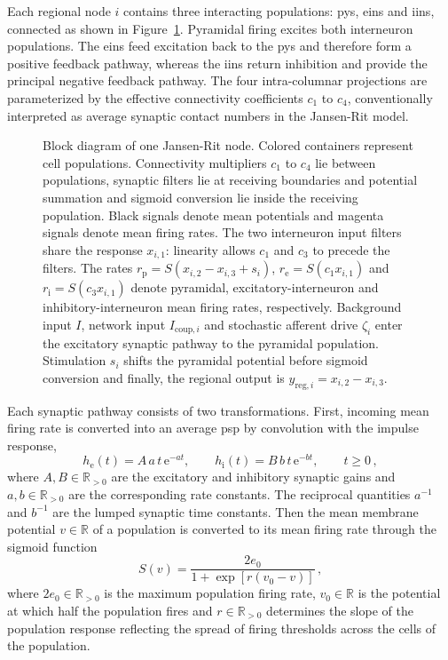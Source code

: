 Each regional node $i$ contains three interacting populations: \acp{py}, \acp{ein} and \acp{iin}, connected as shown in Figure~\ref{fig:microcircuit}.
Pyramidal firing excites both interneuron populations.
The \acp{ein} feed excitation back to the \acp{py} and therefore form a positive feedback pathway, whereas the \acp{iin} return inhibition and provide the principal negative feedback pathway.
The four intra-columnar projections are parameterized by the effective connectivity coefficients $c_1$ to $c_4$, conventionally interpreted as average synaptic contact numbers in the Jansen-Rit model.

\begin{figure}
    \centering
    
    \caption{Block diagram of one Jansen-Rit node. Colored containers represent cell populations.
    Connectivity multipliers $c_1$ to $c_4$ lie between populations, synaptic filters lie at receiving boundaries and potential summation and sigmoid conversion lie inside the receiving population.
    Black signals denote mean potentials and magenta signals denote mean firing rates.
    The two interneuron input filters share the response $x_{i,1}$: linearity allows $c_1$ and $c_3$ to precede the filters.
    The rates $r_{\mathrm p}=S(x_{i,2}-x_{i,3}+s_i)$, $r_{\mathrm e}=S(c_1x_{i,1})$ and $r_{\mathrm i}=S(c_3x_{i,1})$ denote pyramidal, excitatory-interneuron and inhibitory-interneuron mean firing rates, respectively.
    Background input $I$, network input $I_{\mathrm{coup},i}$ and stochastic afferent drive $\zeta_i$ enter the excitatory synaptic pathway to the pyramidal population.
    Stimulation $s_i$ shifts the pyramidal potential before sigmoid conversion and finally, the regional output is $y_{\mathrm{reg},i}=x_{i,2}-x_{i,3}$.}
    \label{fig:microcircuit}
\end{figure}

Each synaptic pathway consists of two transformations.
First, incoming mean firing rate is converted into an average \ac{psp} by convolution with the impulse response,
%
\begin{equation}
    h_\mathrm{e}(t)=A\,a\,t\,\mathrm{e}^{-at},
    \qquad
    h_\mathrm{i}(t)=B\,b\,t\,\mathrm{e}^{-bt},
    \qquad t\geq 0\,,
    \label{eq:psp_kernel}
\end{equation}
%
where $A, B \in \mathbb{R}_{>0}$ are the excitatory and inhibitory synaptic gains and $a, b \in \mathbb{R}_{>0}$ are the corresponding rate constants.
The reciprocal quantities $a^{-1}$ and $b^{-1}$ are the lumped synaptic time constants.
Then the mean membrane potential $v \in \mathbb{R}$ of a population is converted to its mean firing rate through the sigmoid function
%
\begin{equation*}
    S(v)=\frac{2e_0}{1+\exp\!\left[r(v_0-v)\right]}\,,
\end{equation*}
%
where $2e_0 \in \mathbb{R}_{>0}$ is the maximum population firing rate, $v_0 \in \mathbb{R}$ is the potential at which half the population fires and $r \in \mathbb{R}_{>0}$ determines the slope of the population response reflecting the spread of firing thresholds across the cells of the population.

